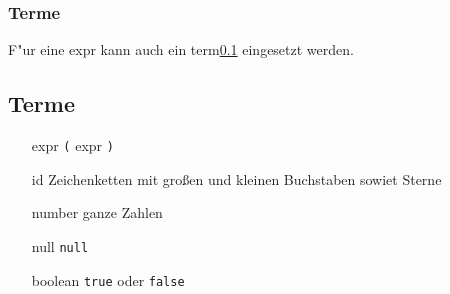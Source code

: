\documentclass{article}
\begin{document}
\subsubsection{Terme}
F"ur eine expr kann auch ein term{\tiny\ref{term}} eingesetzt werden.

\subsection{Terme} \label{term}
\begin{itemize}
\item[expr]{\texttt{(} expr \texttt{)}}
\item[id]{Zeichenketten mit großen und kleinen Buchstaben sowiet Sterne }
\item[number]{ganze Zahlen }
\item[null]{\texttt{null} }
\item[boolean]{\texttt{true} oder \texttt{false} }
\end{itemize}


\newpage

\listoffigures
\end{document}

